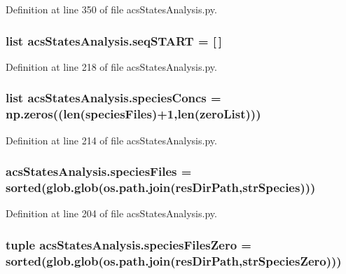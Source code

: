 Definition at line 350 of file acs\-States\-Analysis.\-py.

\hypertarget{a00098_a648282264cfc8a40cf84141f9f59781f}{
\subsubsection[{seq\-S\-T\-A\-R\-T}]{\setlength{\rightskip}{0pt plus 5cm}list acs\-States\-Analysis.\-seq\-S\-T\-A\-R\-T = \mbox{[}$\,$\mbox{]}}}\label{a00098_a648282264cfc8a40cf84141f9f59781f}


Definition at line 218 of file acs\-States\-Analysis.\-py.

\hypertarget{a00098_a2377568425051a7511b51f7c50662ba1}{
\subsubsection[{species\-Concs}]{\setlength{\rightskip}{0pt plus 5cm}list acs\-States\-Analysis.\-species\-Concs = np.\-zeros((len({\bf species\-Files})+1,len({\bf zero\-List})))}}\label{a00098_a2377568425051a7511b51f7c50662ba1}


Definition at line 214 of file acs\-States\-Analysis.\-py.

\hypertarget{a00098_af3291bd263282353dd4a12ee38c08cae}{
\subsubsection[{species\-Files}]{\setlength{\rightskip}{0pt plus 5cm}acs\-States\-Analysis.\-species\-Files = sorted(glob.\-glob(os.\-path.\-join({\bf res\-Dir\-Path},{\bf str\-Species})))}}\label{a00098_af3291bd263282353dd4a12ee38c08cae}


Definition at line 204 of file acs\-States\-Analysis.\-py.

\hypertarget{a00098_a5584994da277e7798c904342dff18427}{
\subsubsection[{species\-Files\-Zero}]{\setlength{\rightskip}{0pt plus 5cm}tuple acs\-States\-Analysis.\-species\-Files\-Zero = sorted(glob.\-glob(os.\-path.\-join({\bf res\-Dir\-Path},{\bf str\-Species\-Zero})))}}\label{a00098_a5584994da277e7798c904342dff18427}


